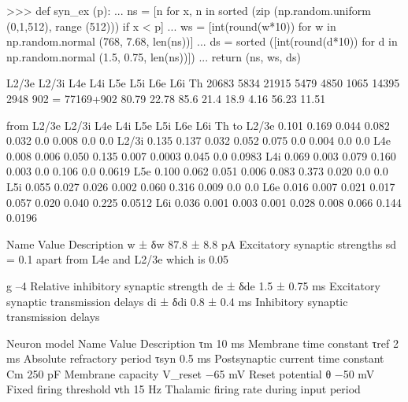 >>> def syn_ex (p):
...     ns = [n for x, n in sorted (zip (np.random.uniform (0,1,512), range (512))) if x < p]
...     ws = [int(round(w*10)) for w in np.random.normal (768, 7.68, len(ns))]
...     ds = sorted ([int(round(d*10)) for d in np.random.normal (1.5, 0.75, len(ns))])
...     return (ns, ws, ds)     


                L2/3e	L2/3i	L4e		L4i    	L5e   	L5i            L6e	        L6i	       Th
                20683 	5834 	21915 	5479 	4850 	1065 	14395      2948 	902 = 77169+902
                80.79       22.78      85.6          21.4         18.9         4.16          56.23       11.51

                                                                  from				
                L2/3e	L2/3i	L4e		L4i    	L5e   	L5i            L6e	        L6i	       Th
to  L2/3e	0.101	0.169	0.044	0.082	0.032	0.0	        0.008	0.0   	0.0
     L2/3i	0.135	0.137	0.032	0.052	0.075	0.0	        0.004	0.0    	0.0
     L4e	0.008	0.006	0.050	0.135	0.007	0.0003	0.045	0.0   	0.0983
     L4i	0.069	0.003	0.079	0.160	0.003	0.0	        0.106	0.0   	0.0619
     L5e	0.100	0.062	0.051	0.006	0.083	0.373	0.020	0.0	        0.0
     L5i	0.055	0.027	0.026	0.002	0.060	0.316	0.009	0.0    	0.0
     L6e	0.016	0.007	0.021	0.017	0.057	0.020	0.040	0.225	0.0512
     L6i	0.036	0.001	0.003	0.001	0.028	0.008	0.066	0.144	0.0196

Name	Value	Description
w ± δw	87.8 ± 8.8 pA	Excitatory synaptic strengths sd = 0.1 apart
                                        from  L4e and L2/3e which is 0.05

g	–4	Relative inhibitory synaptic strength
de ± δde	1.5 ± 0.75 ms	Excitatory synaptic transmission delays
di ± δdi	0.8 ± 0.4 ms	Inhibitory synaptic transmission delays

Neuron model
Name	Value	Description
τm	10 ms	Membrane time constant
τref	2 ms	Absolute refractory period
τsyn	0.5 ms	Postsynaptic current time constant
Cm	250 pF	Membrane capacity
V_reset	−65 mV	Reset potential
θ	−50 mV	Fixed firing threshold
νth	15 Hz	Thalamic firing rate during input period
